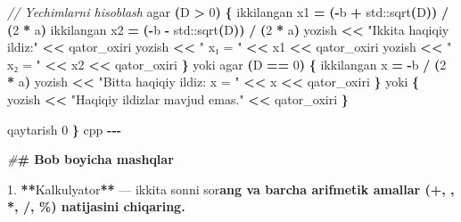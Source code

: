 \documentclass[a4paper,11pt,twoside,openright]{book}
\newenvironment{Shaded}{\begin{snugshade}}{\end{snugshade}}
\newcommand{\BuiltInTok}[1]{#1}
\newcommand{\CharTok}[1]{\textcolor[rgb]{0.31,0.60,0.02}{#1}}
\newcommand{\CommentTok}[1]{\textcolor[rgb]{0.56,0.35,0.01}{\textit{#1}}}
\newcommand{\DecValTok}[1]{\textcolor[rgb]{0.00,0.00,0.81}{#1}}
\newcommand{\ErrorTok}[1]{\textcolor[rgb]{0.64,0.00,0.00}{\textbf{#1}}}
\newcommand{\FloatTok}[1]{\textcolor[rgb]{0.00,0.00,0.81}{#1}}
\newcommand{\NormalTok}[1]{#1}
\newcommand{\OperatorTok}[1]{\textcolor[rgb]{0.81,0.36,0.00}{\textbf{#1}}}
\newcommand{\PreprocessorTok}[1]{\textcolor[rgb]{0.56,0.35,0.01}{\textit{#1}}}
\newcommand{\StringTok}[1]{\textcolor[rgb]{0.31,0.60,0.02}{#1}}
\begin{document}
\begin{Shaded}
\begin{Highlighting}[]
    \CommentTok{// Yechimlarni hisoblash}
\NormalTok{    agar }\OperatorTok{(}\NormalTok{D }\OperatorTok{\textgreater{}} \DecValTok{0}\OperatorTok{)} \OperatorTok{\{}
\NormalTok{        ikkilangan x1 }\OperatorTok{=} \OperatorTok{({-}}\NormalTok{b }\OperatorTok{+} \BuiltInTok{std::}\NormalTok{sqrt}\OperatorTok{(}\NormalTok{D}\OperatorTok{))} \OperatorTok{/} \OperatorTok{(}\DecValTok{2} \OperatorTok{*}\NormalTok{ a}\OperatorTok{)}
\NormalTok{        ikkilangan x2 }\OperatorTok{=} \OperatorTok{({-}}\NormalTok{b }\OperatorTok{{-}} \BuiltInTok{std::}\NormalTok{sqrt}\OperatorTok{(}\NormalTok{D}\OperatorTok{))} \OperatorTok{/} \OperatorTok{(}\DecValTok{2} \OperatorTok{*}\NormalTok{ a}\OperatorTok{)}
\NormalTok{        yozish }\OperatorTok{\textless{}\textless{}} \StringTok{"Ikkita haqiqiy ildiz:"} \OperatorTok{\textless{}\textless{}}\NormalTok{ qator\_oxiri}
\NormalTok{        yozish }\OperatorTok{\textless{}\textless{}} \StringTok{"  x₁ = "} \OperatorTok{\textless{}\textless{}}\NormalTok{ x1 }\OperatorTok{\textless{}\textless{}}\NormalTok{ qator\_oxiri}
\NormalTok{        yozish }\OperatorTok{\textless{}\textless{}} \StringTok{"  x₂ = "} \OperatorTok{\textless{}\textless{}}\NormalTok{ x2 }\OperatorTok{\textless{}\textless{}}\NormalTok{ qator\_oxiri}
    \OperatorTok{\}}\NormalTok{ yoki agar }\OperatorTok{(}\NormalTok{D }\OperatorTok{==} \DecValTok{0}\OperatorTok{)} \OperatorTok{\{}
\NormalTok{        ikkilangan x }\OperatorTok{=} \OperatorTok{{-}}\NormalTok{b }\OperatorTok{/} \OperatorTok{(}\DecValTok{2} \OperatorTok{*}\NormalTok{ a}\OperatorTok{)}
\NormalTok{        yozish }\OperatorTok{\textless{}\textless{}} \StringTok{"Bitta haqiqiy ildiz: x = "} \OperatorTok{\textless{}\textless{}}\NormalTok{ x }\OperatorTok{\textless{}\textless{}}\NormalTok{ qator\_oxiri}
    \OperatorTok{\}}\NormalTok{ yoki }\OperatorTok{\{}
\NormalTok{        yozish }\OperatorTok{\textless{}\textless{}} \StringTok{"Haqiqiy ildizlar mavjud emas."} \OperatorTok{\textless{}\textless{}}\NormalTok{ qator\_oxiri}
    \OperatorTok{\}}

\NormalTok{    qaytarish }\DecValTok{0}
\OperatorTok{\}}
\ErrorTok{\textasciigrave{}\textasciigrave{}\textasciigrave{}}\NormalTok{cpp}
\OperatorTok{{-}{-}{-}}

\PreprocessorTok{\#}\ErrorTok{\# Bob bo\textquotesingle{}yicha mashqlar}

\FloatTok{1.} \OperatorTok{**}\NormalTok{Kalkulyator}\OperatorTok{**}\NormalTok{ — ikkita sonni so}\CharTok{\textquotesingle{}r}\ErrorTok{ang va barcha arifmetik amallar (\textasciigrave{}+\textasciigrave{}, \textasciigrave{}{-}\textasciigrave{}, \textasciigrave{}*\textasciigrave{}, \textasciigrave{}/\textasciigrave{}, \textasciigrave{}\%\textasciigrave{}) natijasini chiqaring.}


\end{Highlighting}
\end{Shaded}
\end{document}
